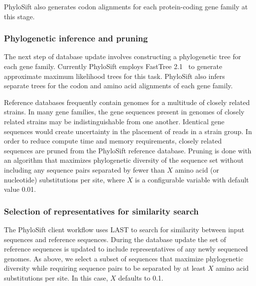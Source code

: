 \documentclass[10pt]{article}
\begin{document}
PhyloSift also generates codon alignments for each protein-coding gene family at this stage.
\subsubsection*{Phylogenetic inference and pruning}
The next step of database update involves constructing a phylogenetic tree for each gene family.
Currently PhyloSift employs FastTree 2.1~\cite{Price2010} to generate approximate maximum likelihood trees for this task.
PhyloSift also infers separate trees for the codon and amino acid alignments of each gene family.

Reference databases frequently contain genomes for a multitude of closely related strains.
In many gene families, the gene sequences present in genomes of closely related strains may be indistinguishable from one another.
Identical gene sequences would create uncertainty in the placement of reads in a strain group.
In order to reduce compute time and memory requirements, closely related sequences are pruned from the PhyloSift reference database.
Pruning is done with an algorithm that maximizes phylogenetic diversity of the sequence set without including any sequence pairs separated by fewer than $X$ amino acid (or nucleotide) substitutions per site, where $X$ is a configurable variable with default value 0.01.

\subsubsection*{Selection of representatives for similarity search}
The PhyloSift client workflow uses LAST to search for similarity between input sequences and reference sequences.
During the database update the set of reference sequences is updated to include representatives of any newly sequenced genomes.
As above, we select a subset of sequences that maximize phylogenetic diversity while requiring sequence pairs to be separated by at least $X$ amino acid substitutions per site.
In this case, $X$ defaults to 0.1.
\end{document}
